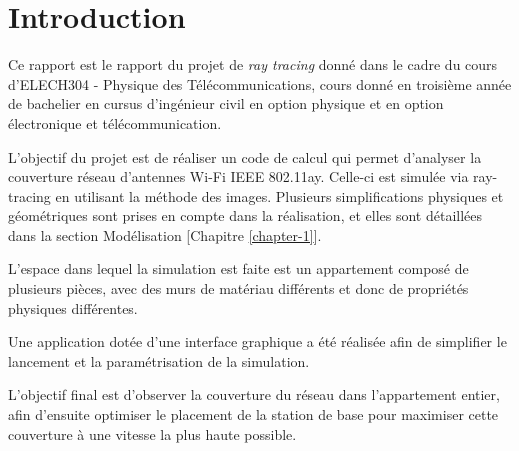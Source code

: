 \chapter*{Introduction}
\label{introduction}
Ce rapport est le rapport du projet de \textit{ray tracing} donné dans le cadre du cours d'ELECH304 - Physique des Télécommunications, cours donné en troisième année de bachelier en cursus d'ingénieur civil en option physique et en option électronique et télécommunication.

L'objectif du projet est de réaliser un code de calcul qui permet d'analyser la couverture réseau d'antennes Wi-Fi IEEE 802.11ay.
Celle-ci est simulée via ray-tracing en utilisant la méthode des images. Plusieurs simplifications physiques et géométriques sont prises en compte dans la réalisation, et elles sont détaillées dans la section Modélisation [Chapitre \ref{chapter-1}].

L'espace dans lequel la simulation est faite est un appartement composé de plusieurs pièces, avec des murs de matériau différents et donc de propriétés physiques différentes.

Une application dotée d'une interface graphique a été réalisée afin de simplifier le lancement et la paramétrisation de la simulation.

L'objectif final est d'observer la couverture du réseau dans l'appartement entier, afin d'ensuite optimiser le placement de la station de base pour maximiser cette couverture à une vitesse la plus haute possible.%
